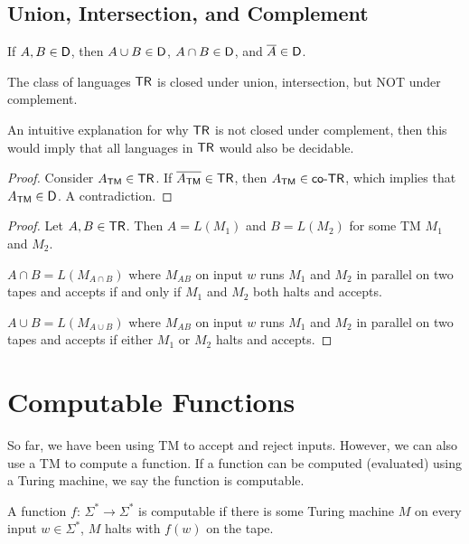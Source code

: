 \subsection{Union, Intersection, and Complement}

\begin{theorem}
    If $A,B \in \mathsf{D}$, then $A \cup B \in \mathsf{D}$, $A \cap B \in \mathsf{D}$, and $\overline{A} \in \mathsf{D}$.
\end{theorem}

\begin{theorem}
    The class of languages $\mathsf{TR}$ is closed under union, intersection, but NOT under complement.
\end{theorem}

An intuitive explanation for why $\mathsf{TR}$ is not closed under complement, then this would imply that all languages in $\mathsf{TR}$ would also be decidable.

\begin{proof}
    Consider $A_{\mathsf{TM}} \in \mathsf{TR}$. If $\overline{A_{\mathsf{TM}}} \in \mathsf{TR}$, then $A_{\mathsf{TM}} \in \mathsf{co}\text{-}\mathsf{TR}$, which implies that $A_{\mathsf{TM}} \in \mathsf{D}$. A contradiction.  
\end{proof}

\begin{proof}
    Let $A,B \in \mathsf{TR}$. Then $A = L(M_1)$ and $B = L(M_2)$ for some TM $M_1$ and $M_2$.

    $A \cap B = L(M_{A\cap B})$ where $M_{AB}$ on input $w$ runs $M_1$ and $M_2$ in parallel on two tapes and accepts if and only if $M_1$ and $M_2$ both halts and accepts.

    $A \cup B = L(M_{A \cup B})$ where $M_{AB}$ on input $w$ runs $M_1$ and $M_2$ in parallel on two tapes and accepts if either $M_1$ or $M_2$ halts and accepts.
\end{proof}

\section{Computable Functions}

So far, we have been using TM to accept and reject inputs. However, we can also use a TM to compute a function. If a function can be computed (evaluated) using a Turing machine, we say the function is computable.

\begin{definition}
    A function $f:\, \Sigma^* \to \Sigma^*$ is computable if there is some Turing machine $M$ on every input $w \in \Sigma^*$, $M$ halts with $f(w)$ on the tape.
\end{definition}

